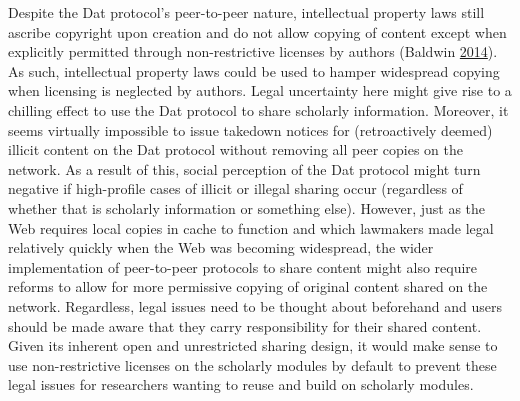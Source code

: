\documentclass[a5paper]{book}
\begin{document}
Despite the Dat protocol's peer-to-peer nature, intellectual property
laws still ascribe copyright upon creation and do not allow copying of
content except when explicitly permitted through non-restrictive
licenses by authors (Baldwin
\protect\hyperlink{ref-isbn:9781400851911}{2014}). As such, intellectual
property laws could be used to hamper widespread copying when licensing
is neglected by authors. Legal uncertainty here might give rise to a
chilling effect to use the Dat protocol to share scholarly information.
Moreover, it seems virtually impossible to issue takedown notices for
(retroactively deemed) illicit content on the Dat protocol without
removing all peer copies on the network. As a result of this, social
perception of the Dat protocol might turn negative if high-profile cases
of illicit or illegal sharing occur (regardless of whether that is
scholarly information or something else). However, just as the Web
requires local copies in cache to function and which lawmakers made
legal relatively quickly when the Web was becoming widespread, the wider
implementation of peer-to-peer protocols to share content might also
require reforms to allow for more permissive copying of original content
shared on the network. Regardless, legal issues need to be thought about
beforehand and users should be made aware that they carry responsibility
for their shared content. Given its inherent open and unrestricted
sharing design, it would make sense to use non-restrictive licenses on
the scholarly modules by default to prevent these legal issues for
researchers wanting to reuse and build on scholarly modules.
\end{document}
